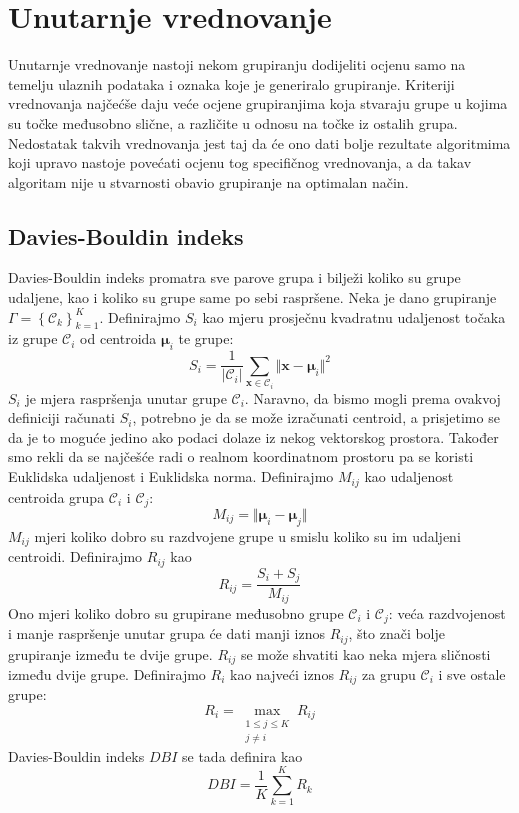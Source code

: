 \documentclass[times, utf8, zavrsni]{fer}
\begin{document}
\section{Unutarnje vrednovanje}
Unutarnje vrednovanje nastoji nekom grupiranju dodijeliti ocjenu samo na temelju ulaznih podataka i oznaka koje je generiralo grupiranje. Kriteriji vrednovanja najčećše daju veće ocjene grupiranjima koja stvaraju grupe u kojima su točke međusobno slične, a različite u odnosu na točke iz ostalih grupa. Nedostatak takvih vrednovanja jest taj da će ono dati bolje rezultate algoritmima koji upravo nastoje povećati ocjenu tog specifičnog vrednovanja, a da takav algoritam nije u stvarnosti obavio grupiranje na optimalan način.

\subsection{Davies-Bouldin indeks}
Davies-Bouldin indeks promatra sve parove grupa i bilježi koliko su grupe udaljene, kao i koliko su grupe same po sebi raspršene. Neka je dano grupiranje $\Gamma = \left\{\mathcal{C}_k\right\}_{k=1}^{K}$. Definirajmo $S_i$ kao mjeru prosječnu kvadratnu udaljenost točaka iz grupe $\mathcal{C}_i$ od centroida $\boldsymbol{\mu}_i$ te grupe:
\[S_i = \frac{1}{\left\vert \mathcal{C}_i \right\vert}
\sum_{\mathbf{x} \in \mathcal{C}_i} \Vert \mathbf{x} - \boldsymbol{\mu}_i  \Vert^2
\]
$S_i$ je mjera raspršenja unutar grupe $\mathcal{C}_i$. Naravno, da bismo mogli prema ovakvoj definiciji računati $S_i$, potrebno je da se može izračunati centroid, a prisjetimo se da je to moguće jedino ako podaci dolaze iz nekog vektorskog prostora. Također smo rekli da se najčešće radi o realnom koordinatnom prostoru pa se koristi Euklidska udaljenost i Euklidska norma. Definirajmo $M_{ij}$ kao udaljenost centroida grupa $\mathcal{C}_i$ i $\mathcal{C}_j$:
\[M_{ij} = \Vert \boldsymbol{\mu}_i - \boldsymbol{\mu}_j \Vert\]
$M_{ij}$ mjeri koliko dobro su razdvojene grupe u smislu koliko su im udaljeni centroidi. Definirajmo $R_{ij}$ kao
\[R_{ij} = \frac{S_i + S_j}{M_{ij}}\]
Ono mjeri koliko dobro su grupirane međusobno grupe $\mathcal{C}_i$ i $\mathcal{C}_j$: veća razdvojenost i manje raspršenje unutar grupa će dati manji iznos $R_{ij}$, što znači bolje grupiranje između te dvije grupe. $R_{ij}$ se može shvatiti kao neka mjera sličnosti između dvije grupe. Definirajmo $R_i$ kao najveći iznos $R_{ij}$ za grupu $\mathcal{C}_i$ i sve ostale grupe:
\[R_i = \max_{\substack{1 \leq j \leq K \\ j \neq i}} R_{ij}\]
Davies-Bouldin indeks $DBI$ se tada definira kao
\[DBI = \frac{1}{K} \sum_{k=1}^{K} R_k\]
\end{document}
